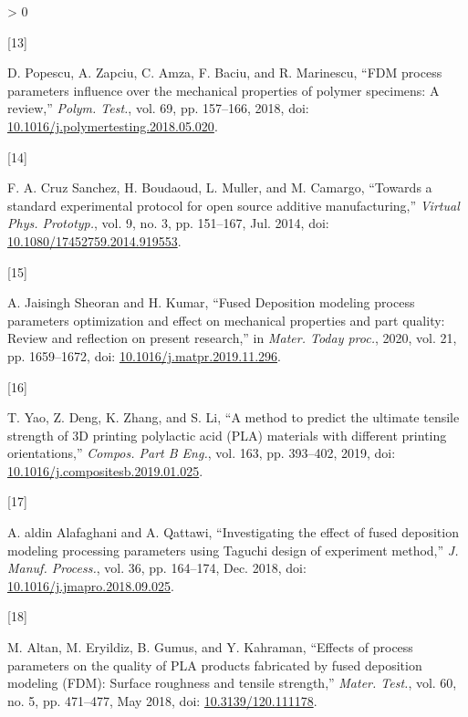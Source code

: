 \documentclass[conference,final,]{IEEEtran}
\newlength{\csllabelwidth}
\newlength{\cslhangindent}
\newenvironment{CSLReferences}[3] %
 {%
  \setlength{\parindent}{0pt}
  \ifodd #1 \everypar{\setlength{\hangindent}{\cslhangindent}}\ignorespaces\fi
  \ifnum #2 > 0
  \setlength{\parskip}{#2\baselineskip}
  \fi
 }%
 {}
\newcommand{\CSLLeftMargin}[1]{\parbox[t]{\csllabelwidth}{#1}}
\newcommand{\CSLRightInline}[1]{\parbox[t]{\linewidth - \csllabelwidth}{#1}}
\begin{document}
\begin{CSLReferences}{0}{0}
\leavevmode\hypertarget{ref-Popescu2018}{}%
\CSLLeftMargin{{[}13{]} }
\CSLRightInline{D. Popescu, A. Zapciu, C. Amza, F. Baciu, and R.
Marinescu, {``{FDM process parameters influence over the mechanical
properties of polymer specimens: A review},''} \emph{Polym. Test.}, vol.
69, pp. 157--166, 2018, doi:
\href{https://doi.org/10.1016/j.polymertesting.2018.05.020}{10.1016/j.polymertesting.2018.05.020}.}

\leavevmode\hypertarget{ref-CruzSanchez2014}{}%
\CSLLeftMargin{{[}14{]} }
\CSLRightInline{F. A. Cruz Sanchez, H. Boudaoud, L. Muller, and M.
Camargo, {``{Towards a standard experimental protocol for open source
additive manufacturing},''} \emph{Virtual Phys. Prototyp.}, vol. 9, no.
3, pp. 151--167, Jul. 2014, doi:
\href{https://doi.org/10.1080/17452759.2014.919553}{10.1080/17452759.2014.919553}.}

\leavevmode\hypertarget{ref-JaisinghSheoran2019}{}%
\CSLLeftMargin{{[}15{]} }
\CSLRightInline{A. Jaisingh Sheoran and H. Kumar, {``{Fused Deposition
modeling process parameters optimization and effect on mechanical
properties and part quality: Review and reflection on present
research},''} in \emph{Mater. Today proc.}, 2020, vol. 21, pp.
1659--1672, doi:
\href{https://doi.org/10.1016/j.matpr.2019.11.296}{10.1016/j.matpr.2019.11.296}.}

\leavevmode\hypertarget{ref-Yao2019}{}%
\CSLLeftMargin{{[}16{]} }
\CSLRightInline{T. Yao, Z. Deng, K. Zhang, and S. Li, {``{A method to
predict the ultimate tensile strength of 3D printing polylactic acid
(PLA) materials with different printing orientations},''} \emph{Compos.
Part B Eng.}, vol. 163, pp. 393--402, 2019, doi:
\href{https://doi.org/10.1016/j.compositesb.2019.01.025}{10.1016/j.compositesb.2019.01.025}.}

\leavevmode\hypertarget{ref-Alafaghani2018}{}%
\CSLLeftMargin{{[}17{]} }
\CSLRightInline{A. aldin Alafaghani and A. Qattawi, {``{Investigating
the effect of fused deposition modeling processing parameters using
Taguchi design of experiment method},''} \emph{J. Manuf. Process.}, vol.
36, pp. 164--174, Dec. 2018, doi:
\href{https://doi.org/10.1016/j.jmapro.2018.09.025}{10.1016/j.jmapro.2018.09.025}.}

\leavevmode\hypertarget{ref-Altan2018}{}%
\CSLLeftMargin{{[}18{]} }
\CSLRightInline{M. Altan, M. Eryildiz, B. Gumus, and Y. Kahraman,
{``{Effects of process parameters on the quality of PLA products
fabricated by fused deposition modeling (FDM): Surface roughness and
tensile strength},''} \emph{Mater. Test.}, vol. 60, no. 5, pp. 471--477,
May 2018, doi:
\href{https://doi.org/10.3139/120.111178}{10.3139/120.111178}.}


\end{CSLReferences}
\end{document}
